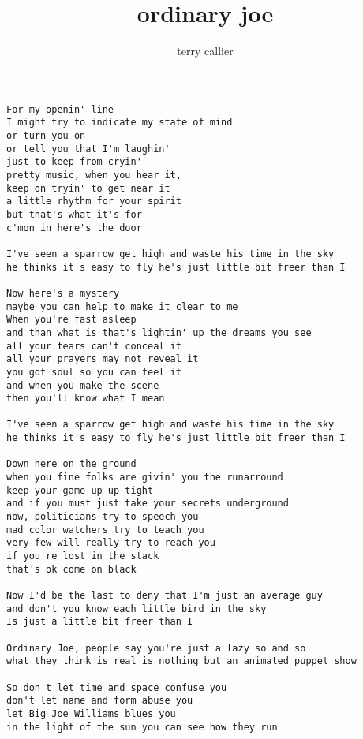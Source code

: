 \author{terry callier}
\title{ordinary joe}
\maketitle
\begin{verbatim}
For my openin' line
I might try to indicate my state of mind
or turn you on
or tell you that I'm laughin'
just to keep from cryin'
pretty music, when you hear it,
keep on tryin' to get near it
a little rhythm for your spirit
but that's what it's for
c'mon in here's the door

I've seen a sparrow get high and waste his time in the sky
he thinks it's easy to fly he's just little bit freer than I

Now here's a mystery
maybe you can help to make it clear to me
When you're fast asleep
and than what is that's lightin' up the dreams you see
all your tears can't conceal it
all your prayers may not reveal it
you got soul so you can feel it
and when you make the scene
then you'll know what I mean

I've seen a sparrow get high and waste his time in the sky
he thinks it's easy to fly he's just little bit freer than I

Down here on the ground
when you fine folks are givin' you the runarround
keep your game up up-tight
and if you must just take your secrets underground
now, politicians try to speech you
mad color watchers try to teach you
very few will really try to reach you
if you're lost in the stack
that's ok come on black

Now I'd be the last to deny that I'm just an average guy
and don't you know each little bird in the sky
Is just a little bit freer than I

Ordinary Joe, people say you're just a lazy so and so
what they think is real is nothing but an animated puppet show

So don't let time and space confuse you
don't let name and form abuse you
let Big Joe Williams blues you
in the light of the sun you can see how they run
\end{verbatim}